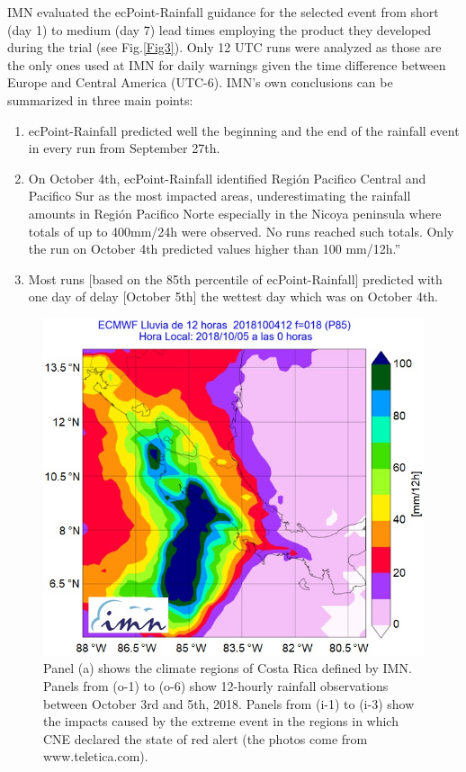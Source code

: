\documentclass[twocol]{ametsocV5} %
\begin{document}
IMN evaluated the ecPoint-Rainfall guidance for the selected event from short (day 1) to medium (day 7) lead times employing the product they developed during the trial (see Fig.\ref{Fig3}). Only 12 UTC runs were analyzed as those are the only ones used at IMN for daily warnings given the time difference between Europe and Central America (UTC-6). IMN’s own conclusions can be summarized in three main points:

\begin{enumerate}
\item ecPoint-Rainfall predicted well the beginning and the end of the rainfall event in every run from September 27th.
\item On October 4th, ecPoint-Rainfall identified Región Pacifico Central and Pacifico Sur as the most impacted areas, underestimating the rainfall amounts in Región Pacifico Norte especially in the Nicoya peninsula where totals of up to 400mm/24h were observed. No runs reached such totals. Only the run on October 4th predicted values higher than 100 mm/12h.”
\item Most runs [based on the 85th percentile of ecPoint-Rainfall] predicted with one day of delay [October 5th] the wettest day which was on October 4th.
\end{enumerate}

\begin{figure}
\centerline{\includegraphics[width=39pc]{manuscript/Figures/Fig5.jpg}}
\caption{Panel (a) shows the climate regions of Costa Rica defined by IMN. Panels from (o-1) to (o-6) show 12-hourly rainfall observations between October 3rd and 5th, 2018. Panels from (i-1) to (i-3) show the impacts caused by the extreme event in the regions in which CNE declared the state of red alert (the photos come from www.teletica.com).}
\label{Fig5}
\end{figure}
\end{document}
